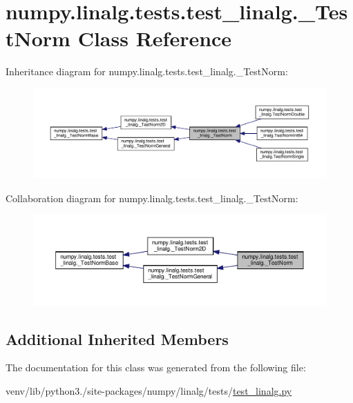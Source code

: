 \hypertarget{classnumpy_1_1linalg_1_1tests_1_1test__linalg_1_1__TestNorm}{}\section{numpy.\+linalg.\+tests.\+test\+\_\+linalg.\+\_\+\+Test\+Norm Class Reference}
\label{classnumpy_1_1linalg_1_1tests_1_1test__linalg_1_1__TestNorm}


Inheritance diagram for numpy.\+linalg.\+tests.\+test\+\_\+linalg.\+\_\+\+Test\+Norm\+:
\nopagebreak
\begin{figure}[H]
\begin{center}
\leavevmode
\includegraphics[width=350pt]{classnumpy_1_1linalg_1_1tests_1_1test__linalg_1_1__TestNorm__inherit__graph}
\end{center}
\end{figure}


Collaboration diagram for numpy.\+linalg.\+tests.\+test\+\_\+linalg.\+\_\+\+Test\+Norm\+:
\nopagebreak
\begin{figure}[H]
\begin{center}
\leavevmode
\includegraphics[width=350pt]{classnumpy_1_1linalg_1_1tests_1_1test__linalg_1_1__TestNorm__coll__graph}
\end{center}
\end{figure}
\subsection*{Additional Inherited Members}


The documentation for this class was generated from the following file\+:\begin{DoxyCompactItemize}
\item 
venv/lib/python3./site-\/packages/numpy/linalg/tests/\hyperlink{test__linalg_8py}{test\+\_\+linalg.\+py}\end{DoxyCompactItemize}
